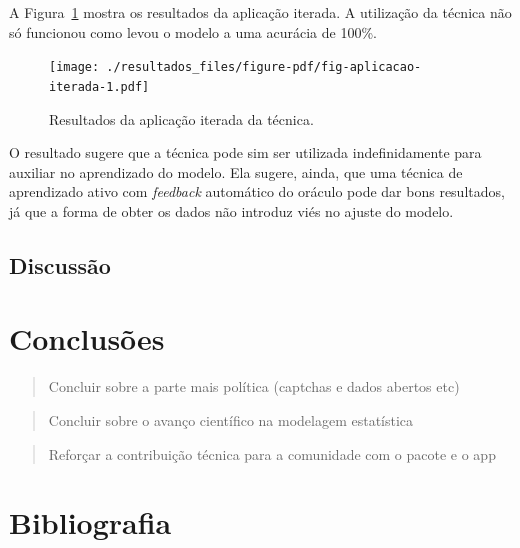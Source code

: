 \documentclass[12pt,twoside,brazilian]{book}
\begin{document}
A Figura~\ref{fig-aplicacao-iterada} mostra os resultados da aplicação
iterada. A utilização da técnica não só funcionou como levou o modelo a
uma acurácia de 100\%.

\begin{figure}

{\centering \texttt{[image: ./resultados\_files/figure-pdf/fig-aplicacao-iterada-1.pdf]}

}

\caption{\label{fig-aplicacao-iterada}Resultados da aplicação iterada da
técnica.}

\end{figure}

O resultado sugere que a técnica pode sim ser utilizada indefinidamente
para auxiliar no aprendizado do modelo. Ela sugere, ainda, que uma
técnica de aprendizado ativo com \emph{feedback} automático do oráculo
pode dar bons resultados, já que a forma de obter os dados não introduz
viés no ajuste do modelo.

\hypertarget{sec-discussao}{%
\section{Discussão}\label{sec-discussao}}


\hypertarget{conclusao}{%
\chapter{Conclusões}\label{conclusao}}

\begin{quote}
Concluir sobre a parte mais política (captchas e dados abertos etc)
\end{quote}

\begin{quote}
Concluir sobre o avanço científico na modelagem estatística
\end{quote}

\begin{quote}
Reforçar a contribuição técnica para a comunidade com o pacote e o app
\end{quote}


\hypertarget{bibliografia}{%
\chapter*{Bibliografia}\label{bibliografia}}
\end{document}
